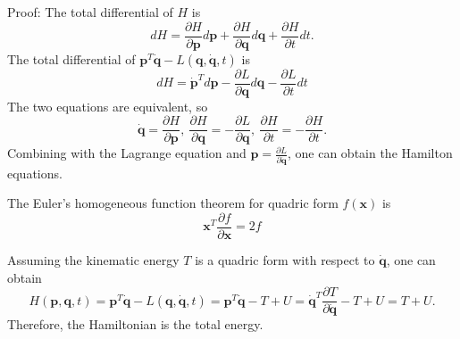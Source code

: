 Proof:
    The total differential of $H$ is 
    $$dH = \frac{\partial H}{\partial \mathbf{p}}d\mathbf{p} + \frac{\partial H}{\partial \mathbf{q}}d\mathbf{q} + \frac{\partial H}{\partial t}dt.$$
    The total differential of $\mathbf{p}^{T}\dot{\mathbf{q}}-L(\mathbf{q},\dot{\mathbf{q}},t)$ is 
    $$dH = \dot{\mathbf{p}}^{T}d\mathbf{p} - \frac{\partial L}{\partial \mathbf{q}}d\mathbf{q} - \frac{\partial L}{\partial t}dt$$
    The two equations are equivalent, so 
\begin{equation}
    \dot{\mathbf{q}}=\frac{\partial H}{\partial \mathbf{p}},\ \frac{\partial H}{\partial \mathbf{q}}=-\frac{\partial L}{\partial \mathbf{q}},\ \frac{\partial H}{\partial t}=-\frac{\partial H}{\partial t}.
\end{equation}
    Combining with the Lagrange equation and $\mathbf{p}=\frac{\partial L}{\partial \dot{\mathbf{q}}}$, one can obtain the Hamilton equations.

The Euler's homogeneous function theorem for quadric form $f(\mathbf{x})$ is 
\begin{equation}
    \mathbf{x}^{T}\frac{\partial f}{\partial \mathbf{x}}=2f
\end{equation}

Assuming the kinematic energy $T$ is a quadric form with respect to $\dot{\mathbf{q}}$, one can obtain 
\begin{equation}
    H(\mathbf{p},\mathbf{q},t)=\mathbf{p}^{T}\dot{\mathbf{q}}-L(\mathbf{q},\dot{\mathbf{q}},t)=\mathbf{p}^{T}\dot{\mathbf{q}}-T+U=\dot{\mathbf{q}}^{T}\frac{\partial T}{\partial \dot{\mathbf{q}}}-T+U=T+U.
\end{equation}
Therefore, the Hamiltonian is the total energy.
